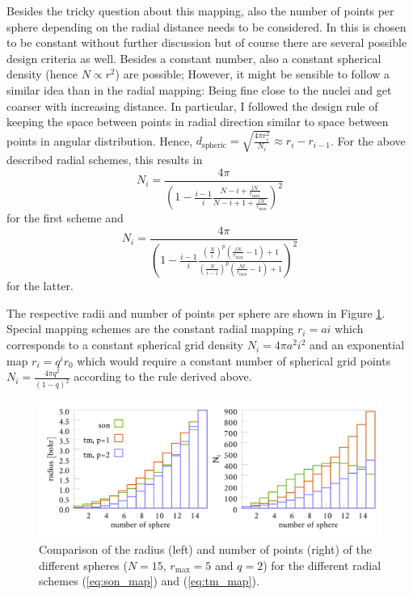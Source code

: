 Besides the tricky question about this mapping, also the number of points per sphere depending on the radial distance needs to be considered. 
In \cite{Son_Chu0} this is chosen to be constant without further discussion but of course there are several possible design criteria as well.
Besides a constant number, also a constant spherical density (hence $N\propto r^2$) are possible; However, it might be sensible to follow a similar idea than in the radial mapping: Being fine close to the nuclei and get coarser with increasing distance.
In particular, I followed the design rule of keeping the space between points in radial direction similar to space between points in angular distribution.
Hence, $d_\text{spheric}=\sqrt{\frac{4\pi r_i^2}{N_i}}\approx r_i-r_{i-1}$.
For the above described radial schemes, this results in 
\begin{equation}\label{eq:tm_num}
N_i= \frac{4\pi}{ \left(1-\frac{i-1 }{i}\frac{N-i+\frac{lN}{r_\text{max}}}{N-i+1+\frac{lN}{r_\text{max}}}\right)^2 }
\end{equation}
for the first scheme and 
\begin{equation} \label{eq:son_num}
N_i= \frac{4\pi}{\left(1-\frac{i-1 }{i}\frac{ (\frac{N}{i})^p \left(\frac{lN}{r_\text{max}}-1\right)+1}{ (\frac{N}{i-1})^p\left( \frac{Nl}{r_\text{max}} -1 \right) +1 } \right)^2 }
\end{equation}
for the latter.

The respective radii and number of points per sphere are shown in Figure \ref{fig:maps}.\\
Special mapping schemes are the constant radial mapping $r_i=a i$ which corresponds to a constant spherical grid density $N_i=4\pi a^2 i^2$ and an exponential map $r_i=q^i r_0$ which would require a constant number of spherical grid points $N_i=\frac{4\pi q^2}{(1-q)^2}$ according to the rule derived above.

\begin{figure}
\includegraphics[width=\textwidth]{Data/radial_mapping}
\caption{Comparison of the radius (left) and number of points (right) of the different spheres ($N=15$, $r_\text{max}=5$ and $q=2$) for the different radial schemes (\ref{eq:son_map}) and (\ref{eq:tm_map}).}
\label{fig:maps}
\end{figure}

